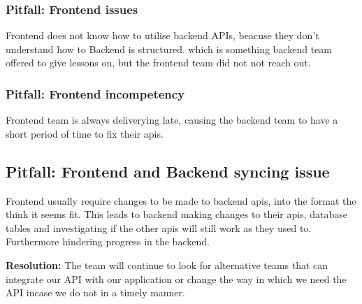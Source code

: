 \subsubsection*{Pitfall: Frontend issues}
Frontend does not know how to utilise backend APIs, beacuse they don't understand how to Backend is structured. which is something backend team offered to give lessons on, but the frontend team did not not reach out.

\subsubsection*{Pitfall: Frontend incompetency}
Frontend team is always deliverying late, causing the backend team to have a short period of time to fix their apis.

\subsection*{Pitfall: Frontend and Backend syncing issue}
Frontend usually require changes to be made to backend apis, into the format the think it seems fit.
This leads to backend making changes to their apis, database tables and investigating if the other apis will still work as they used to. Furthermore hindering progress in the backend.


\textbf{Resolution:} The team will continue to look for alternative teams that can integrate our API with our application or change the way in which we need the API incase we do not in a timely manner.